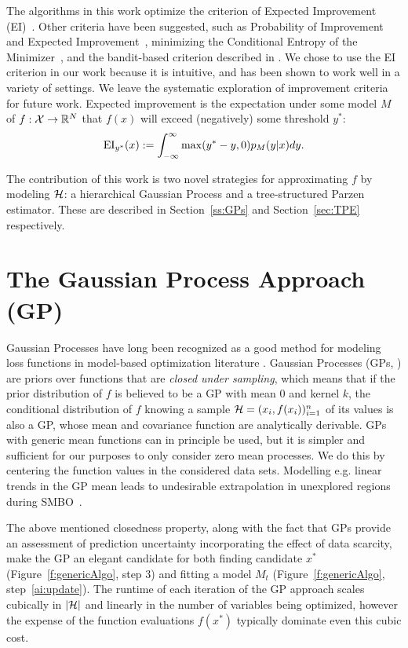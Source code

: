 \documentclass{article}
\newcommand{\vs}[1]{\vspace*{-#1mm}}
\newcommand{\Bs}{\vs{2}}
\newcommand{\as}{\vs{1}}
\begin{document}
The algorithms in this work optimize the criterion of Expected Improvement
(EI)~\cite{Jon01}.
Other criteria have been suggested, such as
Probability of Improvement and Expected Improvement~\citep{Jon01},
minimizing the Conditional Entropy of the Minimizer~\citep{ViVaWa06},
and the bandit-based criterion described in \cite{SrKrKaSe10}.
We chose to use the EI criterion in our work because it is intuitive, and has
been shown to work well in a variety of settings.
We leave the systematic exploration of improvement criteria for future work.
Expected improvement is the expectation under some model $M$ of
$f: {\cal X} \rightarrow \mathbb{R}^N$ that $f(x)$ will exceed (negatively) some threshold
$y^*$:
\begin{equation}
\vs{.5}
\text{EI}_{y^*}(x):=\int_{-\infty}^{\infty} \max(y^* - y, 0) p_M(y\vert x) dy.
\label{e:EI}
\vs{.5}
\end{equation}

The contribution of this work is two novel strategies for
approximating $f$ by modeling $\cal H$:
a hierarchical Gaussian Process and a tree-structured Parzen estimator.
These are described in Section~\ref{ss:GPs} and Section~\ref{sec:TPE}
respectively.

\Bs
\section{The Gaussian Process Approach (GP)}
\as
\label{ss:GPs}
Gaussian Processes have long been recognized as a good method for modeling
loss functions in model-based optimization literature \cite{MoTiZi78}.
Gaussian Processes (GPs, \cite{RaWi06}) are priors over functions that are
{\it closed under sampling}, which means that if the prior
distribution of $f$ is believed to be a GP with mean $0$ and kernel
$k$, the conditional distribution of $f$ knowing a sample
${\cal H} = (x_i,f(x_i))_{i=1}^n$ of its
values is also a GP, whose mean and covariance function are
analytically derivable. GPs with generic mean functions can in
principle be used, but it is simpler
and sufficient for our purposes to only consider zero mean processes.
We do this by centering the function values in the considered data
sets. Modelling e.g. linear trends in the GP mean leads to
undesirable extrapolation in unexplored regions during SMBO~\cite{GiDuBaCaRo09}.

The above mentioned closedness property, along
with the fact that GPs provide an assessment of prediction uncertainty incorporating the
effect of data scarcity, make the GP an elegant candidate for both
finding candidate $x^*$ (Figure~\ref{f:genericAlgo}, step 3) and
fitting a model $M_t$ (Figure~\ref{f:genericAlgo}, step~\ref{ai:update}).
The runtime of each iteration of
the GP approach scales cubically in $|{\cal H}|$ and linearly in
the number of variables being optimized, however the expense of the function
evaluations $f(x^*)$ typically dominate even this cubic cost.
\end{document}
